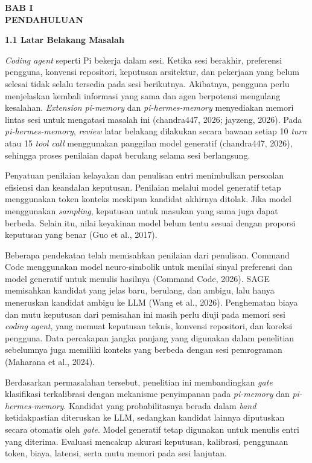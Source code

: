 \documentclass[12pt,a4paper]{article}
\newcommand{\asing}[1]{\textit{#1}}
\newcommand{\pim}{\textit{pi-memory}}
\newcommand{\phm}{\textit{pi-hermes-memory}}
\newcommand{\bab}[3]{%
  \clearpage\phantomsection\label{#3}%
  \begin{center}\large\bfseries BAB #1\\[0.2em] #2\end{center}\vspace{0.8em}}
\newcommand{\subbab}[2]{%
  \par\vspace{0.8em}\phantomsection\label{#2}%
  \noindent\textbf{#1}\par\nopagebreak\vspace{0.3em}}
\begin{document}
\clearpage
{}

\bab{I}{PENDAHULUAN}{sec:bab1}

\subbab{1.1 Latar Belakang Masalah}{sec:1.1}

\asing{Coding agent} seperti Pi bekerja dalam sesi. Ketika sesi berakhir, preferensi pengguna, konvensi repositori, keputusan arsitektur, dan pekerjaan yang belum selesai tidak selalu tersedia pada sesi berikutnya. Akibatnya, pengguna perlu menjelaskan kembali informasi yang sama dan agen berpotensi mengulang kesalahan. \asing{Extension} \pim{} dan \phm{} menyediakan memori lintas sesi untuk mengatasi masalah ini (chandra447, 2026; jayzeng, 2026). Pada \phm{}, \asing{review} latar belakang dilakukan secara bawaan setiap 10 \asing{turn} atau 15 \asing{tool call} menggunakan panggilan model generatif (chandra447, 2026), sehingga proses penilaian dapat berulang selama sesi berlangsung.

Penyatuan penilaian kelayakan dan penulisan entri menimbulkan persoalan efisiensi dan keandalan keputusan. Penilaian melalui model generatif tetap menggunakan token konteks meskipun kandidat akhirnya ditolak. Jika model menggunakan \asing{sampling}, keputusan untuk masukan yang sama juga dapat berbeda. Selain itu, nilai keyakinan model belum tentu sesuai dengan proporsi keputusan yang benar (Guo et al., 2017).

Beberapa pendekatan telah memisahkan penilaian dari penulisan. Command Code menggunakan model neuro-simbolik untuk menilai sinyal preferensi dan model generatif untuk menulis hasilnya (Command Code, 2026). SAGE memisahkan kandidat yang jelas baru, berulang, dan ambigu, lalu hanya meneruskan kandidat ambigu ke LLM (Wang et al., 2026). Penghematan biaya dan mutu keputusan dari pemisahan ini masih perlu diuji pada memori sesi \asing{coding agent}, yang memuat keputusan teknis, konvensi repositori, dan koreksi pengguna. Data percakapan jangka panjang yang digunakan dalam penelitian sebelumnya juga memiliki konteks yang berbeda dengan sesi pemrograman (Maharana et al., 2024).

Berdasarkan permasalahan tersebut, penelitian ini membandingkan \asing{gate} klasifikasi terkalibrasi dengan mekanisme penyimpanan pada \pim{} dan \phm{}. Kandidat yang probabilitasnya berada dalam \asing{band} ketidakpastian diteruskan ke LLM, sedangkan kandidat lainnya diputuskan secara otomatis oleh \asing{gate}. Model generatif tetap digunakan untuk menulis entri yang diterima. Evaluasi mencakup akurasi keputusan, kalibrasi, penggunaan token, biaya, latensi, serta mutu memori pada sesi lanjutan.
\end{document}
